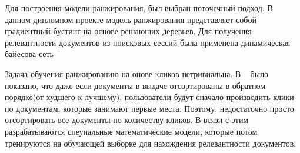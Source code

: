 Для построения модели ранжирования, был выбран поточечный подход. В данном дипломном проекте модель ранжирования представляет собой градиентный бустинг на основе решающих деревьев. Для получения релевантности документов из поисковых сессий была применена динамическая байесова сеть

Задача обучения ранжированию на онове кликов нетривиальна. В ~\cite{joachims} было показано, что даже если документы в выдаче отсортированы в обратном порядке(от худшего к лучшему), пользователи будут сначало производить клики по документам, которые занимают первые места. Поэтому, недостаточно просто отсортировать все документы по количеству кликов. В всязи с этим разрабатываются спеуиальные математические модели, которые потом тренируются на обучающей выборке для нахождения релевантности документов.
